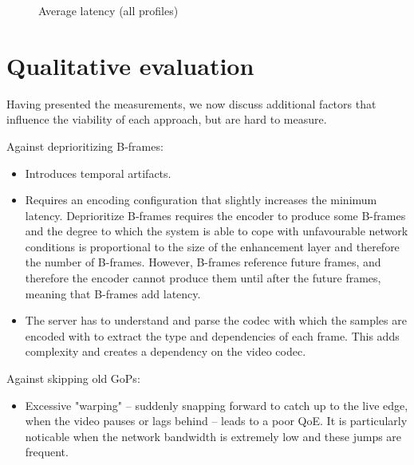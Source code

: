 \begin{figure}
    \centering
    
    \caption{Average latency (all profiles)}
    \label{fig:avg_latency}
\end{figure}

\section{Qualitative evaluation}
Having presented the measurements, we now discuss additional factors that influence the viability of each approach, but are hard to measure. 

Against deprioritizing B-frames:
\begin{itemize}
    \item Introduces temporal artifacts.
    \item Requires an encoding configuration that slightly increases the minimum latency. Deprioritize B-frames requires the encoder to produce some B-frames and the degree to which the system is able to cope with unfavourable network conditions is proportional to the size of the enhancement layer and therefore the number of B-frames. However, B-frames reference future frames, and therefore the encoder cannot produce them until after the future frames, meaning that B-frames add latency.
    \item The server has to understand and parse the codec with which the samples are encoded with to extract the type and dependencies of each frame. This adds complexity and creates a dependency on the video codec.
\end{itemize}

Against skipping old GoPs:
\begin{itemize}
    \item Excessive "warping" -- suddenly snapping forward to catch up to the live edge, when the video pauses or lags behind -- leads to a poor QoE. It is particularly noticable when the network bandwidth is extremely low and these jumps are frequent.
\end{itemize}
